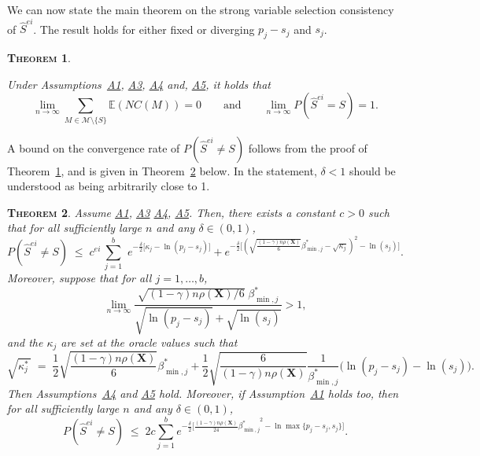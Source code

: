 \documentclass[
  12pt]{article}
\newcommand{\E}{\mathbb{E}}
\newcommand{\M}{\mathcal{M}}
\newcommand{\bX}{\mathbf{X}}
\newtheorem{thm}{\textsc{Theorem}}[section]
\begin{document}
We can now state the main theorem on the strong variable selection consistency of $\hat{S}^{ei}$. The result holds for either fixed or diverging $p_j-s_j$ and $s_j$.
\begin{thm}\label{theo:suffcondlinearmodel}

Under Assumptions~\hyperlink{lab:A1}{A1}, \hyperlink{lab:A3}{A3}, \hyperlink{lab:A4}{A4} and, \hyperlink{lab:A5}{A5}, it holds that
$$\lim_{n \to \infty} \sum_{M \in \M\setminus \{S\}}\E\left(NC(M)\right)= 0 \qquad \mbox{and} \qquad \lim_{n \to \infty} P(\hat{S}^{ei} = S)= 1.$$
\end{thm}

A bound on the convergence rate of $P(\hat{S}^{ei}\neq S)$ follows from the proof of Theorem~\ref{theo:suffcondlinearmodel}, and is given in Theorem~\ref{prop:fullrecovreg} below. %
In the statement, $\delta<1$ should be understood as being arbitrarily close to 1. 
\begin{thm}\label{prop:fullrecovreg}
Assume \hyperlink{lab:A1}{A1}, \hyperlink{lab:A3}{A3} \hyperlink{lab:A4}{A4}, \hyperlink{lab:A5}{A5}.
Then, there exists a constant $c>0$ such that for all sufficiently large $n$ and any $\delta \in (0,1)$,
\begin{equation}\label{eq:rateconvreg}
 P(\hat{S}^{ei} \neq S)\;\leq\; c^{ei}\,\sum_{j=1}^b\,\, e^{-\tfrac{\delta}{2}\big[\kappa_j-\ln(p_j-s_j)\big]} + 
    e^{-\tfrac{\delta}{2}\big[(\sqrt{\frac{(1-\gamma) n\rho(\bX)}{6}}{\beta_{\min,j}^*} - \sqrt{\kappa_j})^2 -\ln(s_j) \big]}.
\end{equation}
Moreover, suppose that for all $j=1,\ldots,b$, 
\begin{equation}\label{eq:suffoptim}
 \lim_{n\to \infty}\frac{\sqrt{(1-\gamma) n\rho(\bX)/6}\;\beta_{\min,j}^*}{\sqrt{\ln(p_j-s_j)} + \sqrt{\ln(s_j)}} >1,
\end{equation}
and the $\kappa_j$ are set at the oracle values such that
	\begin{equation} \label{eq:oraclepenreg}
\sqrt{\kappa^*_j\,} \;=\; \frac12\sqrt{\frac{(1-\gamma) n\rho(\bX)}{6}}{\beta_{\min,j}^*}+\frac12\sqrt{\frac{6}{(1-\gamma) n\rho(\bX)}}\frac{1}{\beta_{\min,j}^*}\big(\ln({p_j-s_j})-\ln({s_j})\big).
\end{equation}
Then Assumptions~\hyperlink{lab:A4}{A4} and \hyperlink{lab:A5}{A5} hold. Moreover, if Assumption~\hyperlink{lab:A1}{A1} holds too, then for all sufficiently large $n$ and any $\delta \in (0,1)$,
\begin{equation}\label{eq:oraclerateconvreg}
    P(\hat{S}^{ei} \neq S) \; \leq \; 2c \sum_{j=1}^b e^{-\tfrac{\delta}{2}\big[\frac{(1-\gamma) n\rho(\bX)}{24}{\beta_{\min,j}^*}^2-\ln \max\{p_j-s_j,s_j\}\big]}.
\end{equation}
\end{thm}
\end{document}
